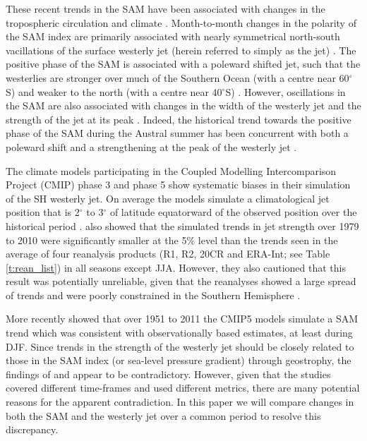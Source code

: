 \documentclass{ametsoc}
\begin{document}
These recent trends in the SAM have been associated with changes in the tropospheric circulation and climate 
\citep{Thompson_and_Solomon_2002, Thompson_et_al_2011}. Month-to-month changes in the polarity of the SAM index are
primarily associated with nearly symmetrical north-south vacillations of the surface westerly jet (herein referred
to simply as the jet)
\citep{Hartmann_and_Lo_1998, Thompson_and_Wallace_2000}. The positive phase of the SAM is associated
with a poleward shifted jet, such that the westerlies are stronger over much of the Southern Ocean 
(with a centre near 60$^{\circ}$S) and weaker to the north (with a centre near 40$^{\circ}$S) 
\citep{Thompson_et_al_2011}. However, oscillations in the SAM are also associated with changes 
in the width of the westerly jet and the strength of the jet at its peak \citep{Monahan_and_Fyfe_2006}. 
Indeed, the historical trend towards the positive phase of the SAM during the Austral summer has 
been concurrent with both a poleward shift and a strengthening at the peak of the westerly 
jet \citep{Swart_and_Fyfe_2012b}. 

The climate models participating in the Coupled Modelling Intercomparison Project (CMIP) phase 3 and phase 5
show systematic biases in their simulation of the SH westerly jet. On average the models simulate a
climatological jet position that is 2$^{\circ}$ to 3$^{\circ}$ of latitude equatorward of the observed 
position over the historical period \citep{Swart_and_Fyfe_2012b, Bracegirdle_et_al_2013}. 
\cite{Swart_and_Fyfe_2012b} also showed that the simulated
trends in jet strength  over 1979 to 2010 were significantly smaller at the 5\% level 
than the trends seen in the average of four reanalysis products (R1, R2, 20CR and ERA-Int; see 
Table \ref{t:rean_list}) 
in all seasons except JJA. However, they also cautioned that this result was potentially unreliable, given 
that the reanalyses showed a large spread of trends and were poorly constrained in the Southern Hemisphere 
\citep{Swart_and_Fyfe_2012b}.

More recently \cite{Gillett_and_Fyfe_2013} showed that over 1951 to 2011 the CMIP5 models simulate a SAM trend 
which was consistent with observationally based estimates, at least during DJF. Since 
trends in the strength of the westerly jet should be closely related to those in the SAM index (or sea-level 
pressure gradient) through geostrophy, the findings of \citet{Swart_and_Fyfe_2012b} and \cite{Gillett_and_Fyfe_2013}
 appear to be contradictory. However, given
that the studies covered different time-frames and used different metrics, there are many potential 
reasons for the apparent contradiction. In this paper we will compare changes in both the SAM and the 
westerly jet over a common period to resolve this discrepancy.
\end{document}
